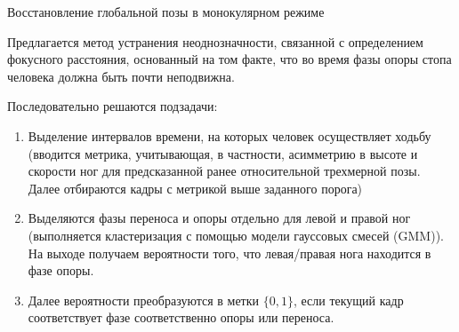 \documentclass[9pt,aspectratio=169]{beamer}
\begin{document}
\begin{frame}{Восстановление глобальной позы в монокулярном режиме}

Предлагается метод устранения неоднозначности, связанной с
определением фокусного расстояния, основанный на том факте,
что во время фазы опоры стопа человека должна быть почти неподвижна.

Последовательно решаются подзадачи:

\begin{enumerate}
    \item Выделение интервалов времени, на которых человек осуществляет
    ходьбу (вводится метрика, учитывающая, в частности, асимметрию
    в высоте и скорости ног для предсказанной ранее относительной
    трехмерной позы. Далее отбираются кадры с метрикой выше заданного
    порога)
    \item Выделяются фазы переноса и опоры отдельно для левой и правой
    ног (выполняется кластеризация с
    помощью модели гауссовых смесей (GMM){}). На выходе получаем вероятности
    того, что левая/правая нога находится в фазе опоры.
    \item Далее вероятности преобразуются в метки $\{0, 1\}$,
    если текущий кадр соответствует фазе соответственно опоры или переноса.

\end{enumerate}

\end{frame}
\end{document}
